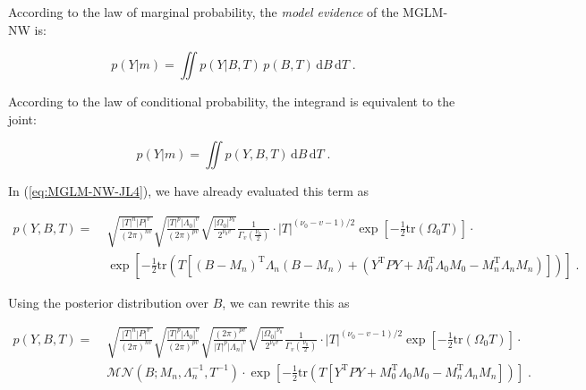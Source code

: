 According to the law of marginal probability, the \textit{model evidence} of the MGLM-NW is:

\begin{equation} \label{eq:MGLM-NW-ME1}
p(Y|m) = \iint p(Y|B,T) \, p(B,T) \, \mathrm{d}B \, \mathrm{d}T \; .
\end{equation}

According to the law of conditional probability, the integrand is equivalent to the joint:

\begin{equation} \label{eq:MGLM-NW-ME2}
p(Y|m) = \iint p(Y,B,T) \, \mathrm{d}B \, \mathrm{d}T \; .
\end{equation}

In (\ref{eq:MGLM-NW-JL4}), we have already evaluated this term as

\vspace{-0.5em}
\begin{equation} \label{eq:MGLM-NW-LME1}
\begin{split}
p(Y,B,T) = \; & \sqrt{\frac{|T|^n |P|^v}{(2 \pi)^{nv}}} \sqrt{\frac{|T|^p |\Lambda_0|^v}{(2 \pi)^{pv}}} \sqrt{\frac{|\Omega_0|^{\nu_0}}{2^{\nu_0 v}}} \frac{1}{\Gamma_v \left( \frac{\nu_0}{2} \right)} \cdot |T|^{(\nu_0-v-1)/2} \exp\left[ -\frac{1}{2} \mathrm{tr}\left( \Omega_0 T \right) \right] \cdot \\
& \exp\left[ -\frac{1}{2} \mathrm{tr}\left( T \left[ (B-M_n)^\mathrm{T} \Lambda_n (B-M_n) + (Y^\mathrm{T} P Y + M_0^\mathrm{T} \Lambda_0 M_0 - M_n^\mathrm{T} \Lambda_n M_n) \right] \right) \right] \; .
\end{split}
\end{equation}

Using the posterior distribution over $B$, we can rewrite this as

\vspace{-0.5em}
\begin{equation} \label{eq:MGLM-NW-LME2}
\begin{split}
p(Y,B,T) = \; & \sqrt{\frac{|T|^n |P|^v}{(2 \pi)^{nv}}} \sqrt{\frac{|T|^p |\Lambda_0|^v}{(2 \pi)^{pv}}} \sqrt{\frac{(2 \pi)^{pv}}{|T|^p |\Lambda_n|^v}} \sqrt{\frac{|\Omega_0|^{\nu_0}}{2^{\nu_0 v}}} \frac{1}{\Gamma_v \left( \frac{\nu_0}{2} \right)} \cdot |T|^{(\nu_0-v-1)/2} \exp\left[ -\frac{1}{2} \mathrm{tr}\left( \Omega_0 T \right) \right] \cdot \\
& \mathcal{MN}(B; M_n, \Lambda_n^{-1}, T^{-1}) \cdot \exp\left[ -\frac{1}{2} \mathrm{tr}\left( T \left[ Y^\mathrm{T} P Y + M_0^\mathrm{T} \Lambda_0 M_0 - M_n^\mathrm{T} \Lambda_n M_n \right] \right) \right] \; .
\end{split}
\end{equation}

